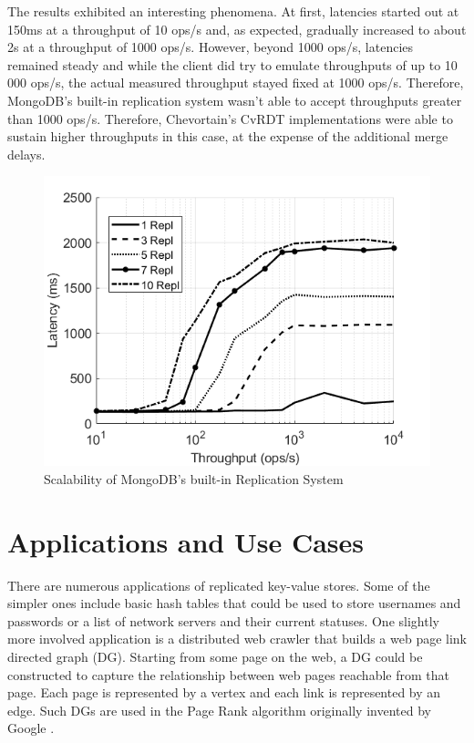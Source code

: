 \documentclass[sigconf,nonacm,10pt]{acmart}
\begin{document}
The results exhibited an interesting phenomena. At first, latencies started out at 150ms at a throughput of 10 ops/s and, as expected, gradually increased to about 2s at a throughput of 1000 ops/s. However, beyond 1000 ops/s, latencies remained steady and while the client did try to emulate throughputs of up to 10 000 ops/s, the actual measured throughput stayed fixed at 1000 ops/s. Therefore, MongoDB's built-in replication system wasn't able to accept throughputs greater than 1000 ops/s. Therefore, Chevortain's CvRDT implementations were able to sustain higher throughputs in this case, at the expense of the additional merge delays.

\begin{figure}[h]
  \centering
  \includegraphics[width=\linewidth]{Fig13SMongo}
  \caption{Scalability of MongoDB's built-in Replication System}
  \label{fig:eval7}
\end{figure}

\section{Applications and Use Cases}
There are numerous applications of replicated key-value stores. Some of the simpler ones include basic hash tables that could be used to store usernames and passwords or a list of network servers and their current statuses. One slightly more involved application is a distributed web crawler that builds a web page link directed graph (DG). Starting from some page on the web, a DG could be constructed to capture the relationship between web pages reachable from that page. Each page is represented by a vertex and each link is represented by an edge. Such DGs are used in the Page Rank algorithm originally invented by Google \cite{brin1998anatomy}.
\end{document}
